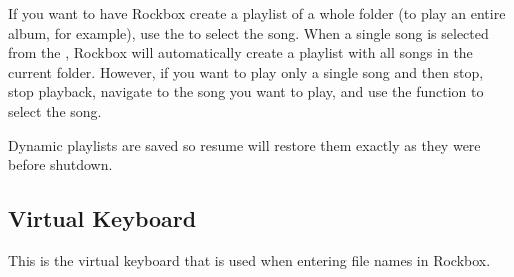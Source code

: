 If you want to have Rockbox create a playlist of a whole folder (to play an 
entire album, for example), use the  to select the song. 
When a single song is selected from the , Rockbox will 
automatically create a playlist with all songs in the current folder. However, 
if you want to play only a single song and then stop, stop playback, navigate 
to the song you want to play, and use the 
 function to select the song.

Dynamic playlists are saved so resume will restore them exactly as they were 
before shutdown.


\subsection{Virtual Keyboard}
This is the virtual keyboard that is used when entering file names in Rockbox.

